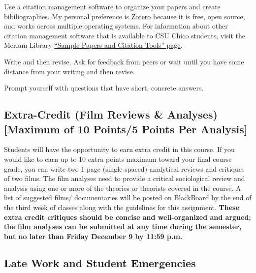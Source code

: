 \documentclass[11pt,]{article}
\begin{document}
Use a citation management software to organize your papers and create
bibiliographies. My personal preference is
\href{https://www.zotero.org/}{Zotero} because it is free, open source,
and works across multiple operating systems. For information about other
citation management software that is available to CSU Chico students,
visit the Meriam Library
\href{https://libguides.csuchico.edu/c.php?g=432300\&p=2948649}{``Sample
Papers and Citation Tools'' page}.

Write and then revise. Ask for feedback from peers or wait until you
have some distance from your writing and then revise.

Prompt yourself with questions that have short, concrete answers.

\hypertarget{extra-credit-film-reviews-analyses-maximum-of-10-points5-points-per-analysis}{%
\subsection{Extra-Credit (Film Reviews \& Analyses) {[}Maximum of 10
Points/5 Points Per
Analysis{]}}\label{extra-credit-film-reviews-analyses-maximum-of-10-points5-points-per-analysis}}

Students will have the opportunity to earn extra credit in this course.
If you would like to earn up to 10 extra points maximum toward your
final course grade, you can write two 1-page (single-spaced) analytical
reviews and critiques of two films. The film analyses need to provide a
critical sociological review and analysis using one or more of the
theories or theorists covered in the course. A list of suggested films/
documentaries will be posted on BlackBoard by the end of the third week
of classes along with the guidelines for this assignment. \textbf{These
extra credit critiques should be concise and well-organized and argued;
the film analyses can be submitted at any time during the semester, but
no later than Friday December 9 by 11:59 p.m.}

\hypertarget{late-work-and-student-emergencies}{%
\subsection{Late Work and Student
Emergencies}\label{late-work-and-student-emergencies}}
\end{document}
